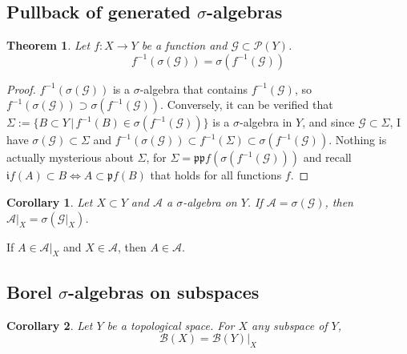 \documentclass[11pt, a4paper, openany]{book}
\newtheorem{thm}{Theorem}\newtheorem{lem}{Lemma}\newtheorem{crl}{Corollary}
\theoremstyle{definition}
\begin{document}
\subsection{Pullback of generated \texorpdfstring{$\sigma$}{sigma}-algebras}
    \begin{thm}\label{sigma commutes with preimage}
        Let $f:X\rightarrow Y$ be a function and $\mathscr{G}\subset\mathscr{P}(Y)$.
        \[f^{-1}(\sigma(\mathscr{G}))=\sigma(f^{-1}(\mathscr{G}))\]
    \end{thm}
    \begin{proof}
        $f^{-1}(\sigma(\mathscr{G}))$ is a $\sigma$-algebra that contains $f^{-1}(\mathscr{G})$, so $f^{-1}(\sigma(\mathscr{G}))\supset\sigma(f^{-1}(\mathscr{G}))$. Conversely, it can be verified that $\Sigma:=\{B\subset Y\,|\,f^{-1}(B)\in\sigma(f^{-1}(\mathscr{G}))\}$ is a $\sigma$-algebra in $Y$, and since $\mathscr{G}\subset \Sigma$, I have $\sigma(\mathscr{G})\subset \Sigma$ and $f^{-1}(\sigma(\mathscr{G}))\subset f^{-1}(\Sigma)\subset\sigma(f^{-1}(\mathscr{G}))$. Nothing is actually mysterious about $\Sigma$, for $\Sigma=\mathfrak{p}\mathfrak{p}f(\sigma(f^{-1}(\mathscr{G})))$ and recall $\mathfrak{i}f(A)\subset B\Longleftrightarrow A\subset \mathfrak{p}f(B)$ that holds for all functions $f$.
    \end{proof}
    \begin{crl}
        Let $X\subset Y$ and $\mathscr{A}$ a $\sigma$-algebra on $Y$. If $\mathscr{A}=\sigma(\mathscr{G})$, then $\mathscr{A}|_X=\sigma(\mathscr{G}|_X)$. %
    \end{crl}
    If $A\in\mathscr{A}|_X$ and $X\in\mathscr{A}$, then $A\in\mathscr{A}$.
\subsection{Borel \texorpdfstring{$\sigma$}{sigma}-algebras on subspaces}
    \begin{crl}\label{Borel Sigma Algebra of Topological Subspace}
        Let $Y$ be a topological space. For $X$ any subspace of $Y$,
        \[\mathscr{B}(X)=\mathscr{B}(Y)|_X\]
    \end{crl}
\end{document}
